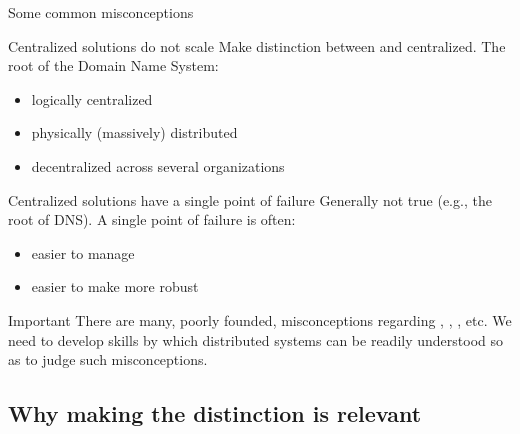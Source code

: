   \begin{slide}{Some common misconceptions}
    \begin{block}{Centralized solutions do not scale}
      Make distinction between  and  centralized. The root of the Domain Name
      System:\vspace*{-6pt}
      \begin{itemize}\tightlist
      \item logically centralized
      \item physically (massively) distributed
      \item decentralized across several organizations
      \end{itemize}
    \end{block}
    \begin{block}{Centralized solutions have a single point of failure}
      Generally not true (e.g., the root of DNS). A single point of
      failure is often:\vspace*{-6pt}
      \begin{itemize}\tightlist
      \item easier to manage
      \item easier to make more robust
      \end{itemize}
    \end{block}
    \begin{alertblock}{Important}
      There are many, poorly founded, misconceptions regarding , ,
      , etc. We need to develop skills by which distributed systems can be readily understood so
      as to judge such misconceptions.
    \end{alertblock}
  \end{slide}
\subsection{Why making the distinction is relevant}
